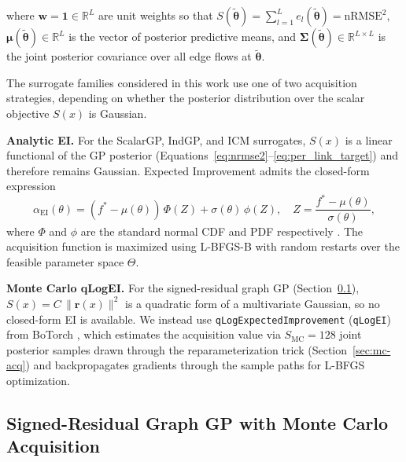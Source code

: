 \documentclass[11pt]{article}
\begin{document}
where $\mathbf{w} = \mathbf{1} \in \mathbb{R}^L$ are unit weights so that
$S(\tilde{\boldsymbol{\theta}}) = \sum_{l=1}^L e_l(\tilde{\boldsymbol{\theta}}) = \mathrm{nRMSE}^2$,
$\boldsymbol{\mu}(\tilde{\boldsymbol{\theta}}) \in \mathbb{R}^L$ is the
vector of posterior predictive means, and
$\boldsymbol{\Sigma}(\tilde{\boldsymbol{\theta}}) \in \mathbb{R}^{L \times L}$
is the joint posterior covariance over all edge flows at
$\tilde{\boldsymbol{\theta}}$.




The surrogate families considered in this work use one of two acquisition strategies,
depending on whether the posterior distribution over the scalar objective $S(x)$ is
Gaussian.

\textbf{Analytic EI.} For the ScalarGP, IndGP, and ICM surrogates, $S(x)$ is a linear
functional of the GP posterior (Equations~\ref{eq:nrmse2}--\ref{eq:per_link_target}) and
therefore remains Gaussian. Expected Improvement admits the closed-form expression
\begin{equation}
  \alpha_{\mathrm{EI}}(\theta) = (f^* - \mu(\theta))\,\Phi(Z) + \sigma(\theta)\,\phi(Z),
  \quad Z = \frac{f^* - \mu(\theta)}{\sigma(\theta)},
\end{equation}
where $\Phi$ and $\phi$ are the standard normal CDF and PDF respectively
\parencite{Garnett2023}. The acquisition function is maximized using L-BFGS-B with random
restarts over the feasible parameter space $\Theta$.

\textbf{Monte Carlo qLogEI.} For the signed-residual graph GP (Section~\ref{sec:signed-residual}),
$S(x) = C\,\|\mathbf{r}(x)\|^2$ is a quadratic form of a multivariate Gaussian, so no
closed-form EI is available. We instead use \texttt{qLogExpectedImprovement}
(\texttt{qLogEI}) from BoTorch \parencite{Balandat2020}, which estimates the acquisition value
via $S_{\mathrm{MC}} = 128$ joint posterior samples drawn through the reparameterization
trick (Section~\ref{sec:mc-acq}) and backpropagates gradients through the sample paths for
L-BFGS optimization.


\subsection{Signed-Residual Graph GP with Monte Carlo Acquisition}
\label{sec:signed-residual}
\end{document}
